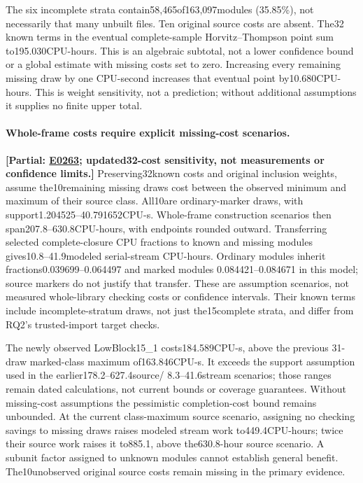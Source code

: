 \documentclass[10pt,twocolumn]{article}
\newcommand{\partialev}[1]{\textbf{[Partial: #1]}}
\newcommand{\expref}[2]{\href{https://github.com/yunwei37/proofserve/blob/main/docs/tmp/build-and-evaluate/step-#1/step-report.md}{E#2}}
\begin{document}
The six incomplete strata contain58,465of163,097modules (35.85\%),
not necessarily that many unbuilt files. Ten original source costs are absent.
The32 known terms in the eventual complete-sample Horvitz--Thompson point
sum to195.030CPU-hours. This is an algebraic subtotal, not a lower confidence
bound or a global estimate with missing costs set to zero.
Increasing every remaining missing draw by one CPU-second increases that
eventual point by10.680CPU-hours. This is weight sensitivity, not a
prediction; without additional assumptions it supplies no finite upper total.

\paragraph{Whole-frame costs require explicit missing-cost scenarios.}
\partialev{\expref{0263-20261102T040256+0000}{0263}; updated32-cost sensitivity, not measurements or confidence limits.}
Preserving32known costs and original inclusion weights, assume the10remaining
missing draws cost between the observed minimum and maximum of their source
class. All10are ordinary-marker draws, with support1.204525--40.791652CPU-s.
Whole-frame construction scenarios then span207.8--630.8CPU-hours,
with endpoints rounded outward.
Transferring selected complete-closure CPU fractions to known and missing
modules gives10.8--41.9modeled serial-stream CPU-hours.
Ordinary modules inherit fractions0.039699--0.064497 and marked modules
0.084421--0.084671 in this model; source markers do not justify that transfer.
These are assumption scenarios, not measured whole-library checking costs
or confidence intervals. Their known terms include incomplete-stratum draws,
not just the15complete strata, and differ from RQ2's trusted-import target checks.

The newly observed LowBlock15\_1 costs184.589CPU-s, above the previous
31-draw marked-class maximum of163.846CPU-s.
It exceeds the support assumption used in the earlier178.2--627.4source/
8.3--41.6stream scenarios; those ranges remain dated calculations, not current
bounds or coverage guarantees.
Without missing-cost assumptions the pessimistic completion-cost bound
remains unbounded. At the current class-maximum source scenario, assigning
no checking savings to missing draws raises modeled stream work to449.4CPU-hours;
twice their source work raises it to885.1, above the630.8-hour source scenario.
A subunit factor assigned to unknown modules cannot establish general benefit.
The10unobserved original source costs remain missing in the primary evidence.
\end{document}
